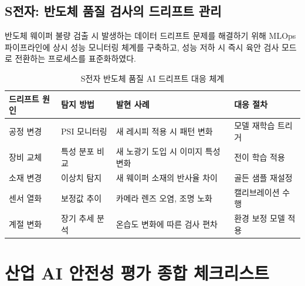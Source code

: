 \subsection{S전자: 반도체 품질 검사의 드리프트 관리}
반도체 웨이퍼 불량 검출 시 발생하는 데이터 드리프트 문제를 해결하기 위해 MLOps 파이프라인에 상시 성능 모니터링 체계를 구축하고, 성능 저하 시 즉시 육안 검사 모드로 전환하는 프로세스를 표준화하였다.

\begin{table}[htbp]
\centering
\caption{S전자 반도체 품질 AI 드리프트 대응 체계}
\label{tab:19_samsung_drift}
\begin{tabularx}{\textwidth}{p{2.5cm}p{2cm}Xp{3cm}}
\toprule
\textbf{드리프트 원인} & \textbf{탐지 방법} & \textbf{발현 사례} & \textbf{대응 절차} \\
\midrule
공정 변경 & PSI 모니터링 & 새 레시피 적용 시 패턴 변화 & 모델 재학습 트리거 \\
장비 교체 & 특성 분포 비교 & 새 노광기 도입 시 이미지 특성 변화 & 전이 학습 적용 \\
소재 변경 & 이상치 탐지 & 새 웨이퍼 소재의 반사율 차이 & 골든 샘플 재설정 \\
센서 열화 & 보정값 추이 & 카메라 렌즈 오염, 조명 노화 & 캘리브레이션 수행 \\
계절 변화 & 장기 추세 분석 & 온습도 변화에 따른 검사 편차 & 환경 보정 모델 적용 \\
\bottomrule
\end{tabularx}
\end{table}

\section{산업 AI 안전성 평가 종합 체크리스트}
\label{sec:19.5}

